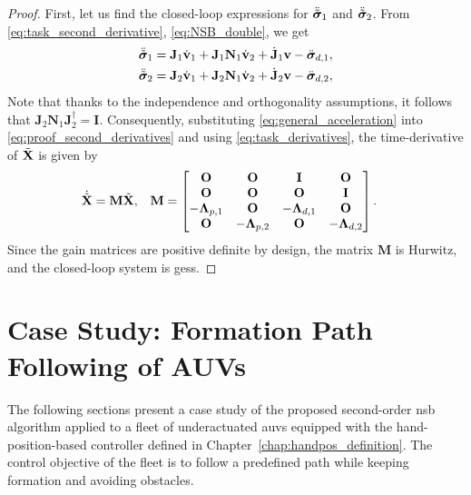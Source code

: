 \begin{proof}
    First, let us find the closed-loop expressions for $\ddot{\Tilde{\bm{\sigma}}}_1$ and $\ddot{\Tilde{\bm{\sigma}}}_2$.
    From \eqref{eq:task_second_derivative}, \eqref{eq:NSB_double}, we get
    \begin{subequations}\label{eq:proof_second_derivatives}
        \begin{align}
            \ddot{\Tilde{\bm{\sigma}}}_1 &= \mathbf{J}_1\dot{\mathbf{v}}_1 + \mathbf{J}_1\mathbf{N}_1\dot{\mathbf{v}}_2 + \dot{\mathbf{J}}_1\mathbf{v} - \ddot{\bm{\sigma}}_{d, 1}, \\
            \ddot{\Tilde{\bm{\sigma}}}_2 &= \mathbf{J}_2\dot{\mathbf{v}}_1 + \mathbf{J}_2\mathbf{N}_1\dot{\mathbf{v}}_2 + \dot{\mathbf{J}}_2\mathbf{v} - \ddot{\bm{\sigma}}_{d, 2}, 
        \end{align}
    \end{subequations}
    Note that thanks to the independence and orthogonality assumptions, it follows that $\mathbf{J}_2 \mathbf{N}_1 \mathbf{J}_2^{\dagger} = \mathbf{I}$.
    Consequently, substituting \eqref{eq:general_acceleration} into \eqref{eq:proof_second_derivatives} and using \eqref{eq:task_derivatives}, the time-derivative of $\Tilde{\mathbf{X}}$ is given by
    \begin{align}
        \dot{\Tilde{\mathbf{X}}} &= \mathbf{M}\Tilde{\mathbf{X}}, &
        \mathbf{M} &= 
        \begin{bmatrix}
            \mathbf{O} & \mathbf{O} & \mathbf{I} & \mathbf{O} \\
            \mathbf{O} & \mathbf{O} & \mathbf{O} & \mathbf{I} \\
            -\mathbf{\Lambda}_{p,1} & \mathbf{O} & -\mathbf{\Lambda}_{d,1} & \mathbf{O} \\
            \mathbf{O} & -\mathbf{\Lambda}_{p,2} & \mathbf{O} & -\mathbf{\Lambda}_{d,2}
        \end{bmatrix}.
    \end{align}
    Since the gain matrices are positive definite by design, the matrix $\mathbf{M}$ is Hurwitz, and the closed-loop system is \glspl{ges}.
\end{proof}

\section{Case Study: Formation Path Following of AUVs}\label{sec:case_study}
The following sections present a case study of the proposed second-order \gls{nsb} algorithm applied to a fleet of underactuated \glspl{auv} equipped with the hand-position-based controller defined in Chapter~\ref{chap:handpos_definition}. The control objective of the fleet is to follow a predefined path while keeping formation and avoiding obstacles.

